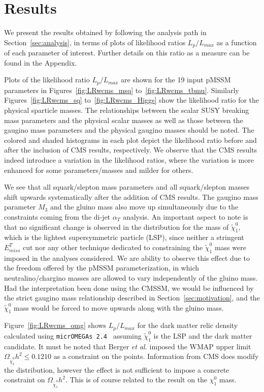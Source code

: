 \section{Results}
\label{sec:results}

We present the results obtained by following the analysis path in Section~\ref{sec:analysis}, in terms of  plots of likelihood ratios $L_p / L_{max}$ as a function of each parameter of interest.  Further details on this ratio as a  measure can be found in the Appendix.  

Plots of the likelihood ratio $L_p/L_{max}$ are shown for the 19 input pMSSM parameters in Figures~\ref{fig:LRwcms_msq} to~\ref{fig:LRwcms_tbmu}.  Similarly Figures~\ref{fig:LRwcms_sq} to~\ref{fig:LRwcms_Higgs} show the likelihood ratio for the physical sparticle masses.  The relationships between the scalar SUSY breaking mass parameters and the physical scalar masses as well as those between the gaugino mass parameters and the physical gaugino masses should be noted.  The colored and shaded histograms in each plot depict the likelihood ratio before and after the inclusion of CMS results, respectively.  We observe that the CMS results indeed introduce a variation in the likelihood ratios, where the variation is more enhanced for some parameters/masses and milder for others.  

We see that all squark/slepton mass parameters and all squark/slepton masses shift upwards systematically after the addition of CMS results.  The gaugino mass parameter $M_3$ and the gluino mass also move up simultaneously due to the constraints coming from the di-jet $\alpha_T$ analysis.  An important aspect to note is that no significant change is observed in the distribution for the mass of $\tilde{\chi}^0_1$, which is the lightest supersymmetric particle (LSP), since neither a stringent $E^T_{miss}$ cut nor any other technique dedicated to constraining the $\tilde{\chi}^0_1$ mass were imposed in the analyses considered.  We are ability to observe this effect due
to the freedom offered by the pMSSM parameterization, in which neutralino/chargino masses are allowed to vary independently of the gluino mass.  Had the interpretation been done using 
the CMSSM, we would be influenced by the strict gaugino mass relationship described in Section~\ref{sec:motivation}, and the $\tilde{\chi}^0_1$ mass would be forced to move upwards along with the gluino mass.

Figure~\ref{fig:LRwcms_omg} shows $L_p/L_{max}$ for the dark matter relic density calculated using {\tt micrOMEGAs 2.4}~\cite{Belanger:2006is} assuming $\tilde{\chi}^0_1$ is the LSP and the dark matter candidate.  It must be noted that Berger {\it et al.} imposed the WMAP upper limit $\Omega_{\tilde{\chi}^0_1}h^2 \le 0.1210$ as a constraint on the points.  Information from CMS does modify the distribution, however the effect is not sufficient to impose a concrete constraint on $\Omega_{\tilde{\chi}^0_1}h^2$.  This is of course related to the result on the $\chi^0_1$ mass.

